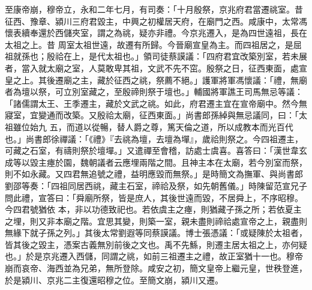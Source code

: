 \begin{pinyinscope}
 至康帝崩，穆帝立，永和二年七月，有司奏：「十月殷祭，京兆府君當遷祧室。昔征西、豫章、潁川三府君毀主，中興之初權居天府，在廟門之西。咸康中，太常馮懷表續奉還於西儲夾室，謂之為祧，疑亦非禮。今京兆遷入，是為四世遠祖，長在太祖之上。昔
 周室太祖世遠，故遷有所歸。今晉廟宣皇為主。而四祖居之，是屈祖就孫也；殷祫在上，是代太祖也。」領司徒蔡謨議：「四府君宜改築別室，若未展者，當入就太廟之室，人莫敢卑其祖，文武不先不窋。殷祭之日，征西東面，處宣皇之上。其後遷廟之主，藏於征西之祧，祭薦不絕。」護軍將軍馮懷議：「禮，無廟者為壇以祭，可立別室藏之，至殷禘則祭于壇也。」輔國將軍譙王司馬無忌等議：「諸儒謂太王、王季遷主，藏於文武之祧。如此，府君遷主宜在宣帝廟中。然今無寢室，宜變通而改築。又殷祫太廟，征西東面。」尚書郎孫綽與無忌議同，曰：「太祖雖位始九
 五，而道以從暢，替人爵之尊，篤天倫之道，所以成教本而光百代也。」尚書郎徐禪議：「《禮》『去祧為壇，去壇為墠』，歲祫則祭之。今四祖遷主，可藏之石室，有禱則祭於壇墠。」又遣禪至會稽，訪處士虞喜。喜答曰：「漢世韋玄成等以毀主瘞於園，魏朝議者云應埋兩階之間。且神主本在太廟，若今別室而祭，則不如永藏。又四君無追號之禮，益明應毀而無祭。」是時簡文為撫軍、與尚書郎劉邵等奏：「四祖同居西祧，藏主石室，禘祫及祭，如先朝舊儀。」時陳留范宣兄子問此禮，宣答曰：「舜廟所祭，皆是庶人，其後世遠而毀，不居舜上，不序昭穆。今四君號猶依
 本，非以功德致祀也。若依虞主之瘞，則猶藏子孫之所；若依夏主之埋，則又非本廟之階。宜思其變，則築一室，親未盡則禘祫處宣帝之上，親盡則無緣下就子孫之列。」其後太常劉遐等同蔡謨議。博士張憑議：「或疑陳於太祖者，皆其後之毀主，憑案古義無別前後之文也。禹不先鯀，則遷主居太祖之上，亦何疑也。」於是京兆遷入西儲，同謂之祧，如前三祖遷主之禮，故正室猶十一也。穆帝崩而哀帝、海西並為兄弟，無所登除。咸安之初，簡文皇帝上繼元皇，世秩登進，於是潁川、京兆二主復還昭穆之位。至簡文崩，潁川又遷。




\end{pinyinscope}
